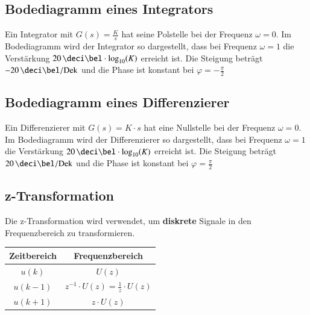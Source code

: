 \subsection{Bodediagramm eines Integrators}
\label{Bodediagramm eines Integrators}

Ein Integrator mit $G(s) = \frac{K}{s}$ hat seine Polstelle bei der Frequenz $\omega = 0$. Im Bodediagramm wird der Integrator so
dargestellt, dass bei Frequenz $\omega = 1$ die Verstärkung $20 \, \deci \bel \cdot \log_{10}(K)$ erreicht ist. 
Die Steigung beträgt $-20 \, \deci \bel / \mathrm{Dek}$ und die Phase ist konstant bei $\varphi = -\frac{\pi}{2}$

 


\subsection{Bodediagramm eines Differenzierer}

Ein Differenzierer mit $G(s) = K \cdot s$ hat eine Nullstelle bei der Frequenz $\omega = 0$. Im Bodediagramm wird der Differenzierer so
dargestellt, dass bei Frequenz $\omega = 1$ die Verstärkung $20 \, \deci \bel \cdot \log_{10}(K)$ erreicht ist.
Die Steigung beträgt $20 \, \deci \bel / \mathrm{Dek}$ und die Phase ist konstant bei $\varphi = \frac{\pi}{2}$

 


\subsection{z-Transformation}
\label{z-Transformation}

Die z-Transformation wird verwendet, um \textbf{diskrete} Signale in den Frequenzbereich zu transformieren.

\renewcommand{\arraystretch}{1}

\begin{center}
    \begin{tabular}{c c}
        \toprule
        \textbf{Zeitbereich}    & \textbf{Frequenzbereich}  \\
        \toprule
        \strut$u(k)$                  & $U(z)$                    \\
        \strut$u(k-1)$                & $z^{-1} \cdot U(z) = \frac{1}{z} \cdot U(z)$ \\
        \strut$u(k+1)$                & $z \cdot U(z)$\\
        \bottomrule
    \end{tabular}
\end{center}


